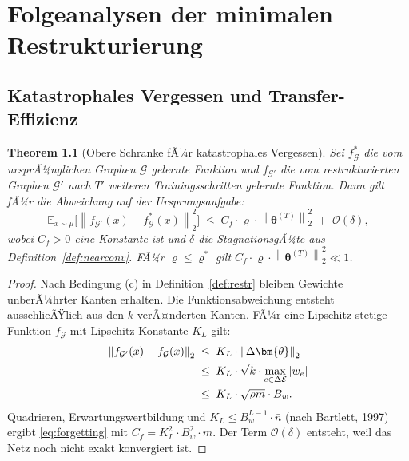 ﻿\documentclass[12pt, a4paper, openany]{report}
\newtheorem{theorem}{Theorem}[chapter]
\newcommand{\E}{\mathbb{E}}
\newcommand{\calG}{\mathcal{G}}
\newcommand{\calE}{\mathcal{E}}
\newcommand{\norms}[1]{\left\|#1\right\|}
\begin{document}
\chapter{Folgeanalysen der minimalen Restrukturierung}
\label{chap:consequences}

\section{Katastrophales Vergessen und Transfer-Effizienz}
\label{sec:forgetting}

\begin{theorem}[Obere Schranke fÃ¼r katastrophales Vergessen]
\label{thm:forgetting}
Sei $f^*_{\calG}$ die vom ursprÃ¼nglichen Graphen $\calG$ gelernte Funktion
und $f_{\calG'}$ die vom restrukturierten Graphen $\calG'$ nach
$T'$ weiteren Trainingsschritten gelernte Funktion.  Dann gilt fÃ¼r die
Abweichung auf der Ursprungsaufgabe:
\begin{equation}
  \label{eq:forgetting}
  \E_{x \sim \mu}\bigl[\norms{f_{\calG'}(x) - f^*_{\calG}(x)}_2^2\bigr]
  \;\leq\;
  C_f \cdot \varrho \cdot \norms{\bm{\theta}^{(T)}}_2^2
  \;+\; \mathcal{O}(\delta),
\end{equation}
wobei $C_f > 0$ eine Konstante ist und $\delta$ die StagnationsgÃ¼te aus
Definition~\ref{def:nearconv}.  FÃ¼r $\varrho \leq \varrho^*$ gilt
$C_f \cdot \varrho \cdot \norms{\bm{\theta}^{(T)}}_2^2 \ll 1$.
\end{theorem}

\begin{proof}
Nach Bedingung (c) in Definition~\ref{def:restr} bleiben Gewichte
unberÃ¼hrter Kanten erhalten.  Die Funktionsabweichung entsteht ausschlieÃŸlich
aus den $k$ verÃ¤nderten Kanten.  FÃ¼r eine Lipschitz-stetige Funktion
$f_{\calG}$ mit Lipschitz-Konstante $K_L$ gilt:
\begin{align}
  \norms{f_{\calG'}(x) - f_{\calG}(x)}_2
  &\;\leq\; K_L \cdot \norms{\Delta\bm{\theta}}_2 \notag \\
  &\;\leq\; K_L \cdot \sqrt{k} \cdot \max_{e \in \Delta\calE} |w_e| \notag \\
  &\;\leq\; K_L \cdot \sqrt{\varrho m} \cdot B_w.
\end{align}
Quadrieren, Erwartungswertbildung und $K_L \leq B_w^{L-1} \cdot \bar{n}$
(nach Bartlett, 1997) ergibt \eqref{eq:forgetting} mit
$C_f = K_L^2 \cdot B_w^2 \cdot m$.  Der Term $\mathcal{O}(\delta)$
entsteht, weil das Netz noch nicht exakt konvergiert ist.
\end{proof}
\end{document}
